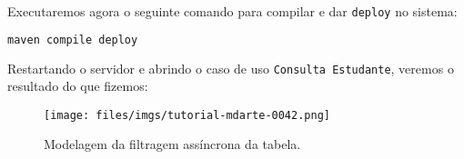 Executaremos agora o seguinte comando para compilar e dar \texttt{deploy} no
sistema:
\begin{lstlisting}[language=bash, frame=single, breaklines=true]
maven compile deploy
\end{lstlisting}

Restartando o servidor e abrindo o caso de uso \texttt{Consulta Estudante},
veremos o resultado do que fizemos:
\begin{figure}[H]
	\centering
	\texttt{[image: files/imgs/tutorial-mdarte-0042.png]}
	\caption{Modelagem da filtragem assíncrona da tabela.}
	\label{modelando_filtragem_assincrona}
\end{figure}
